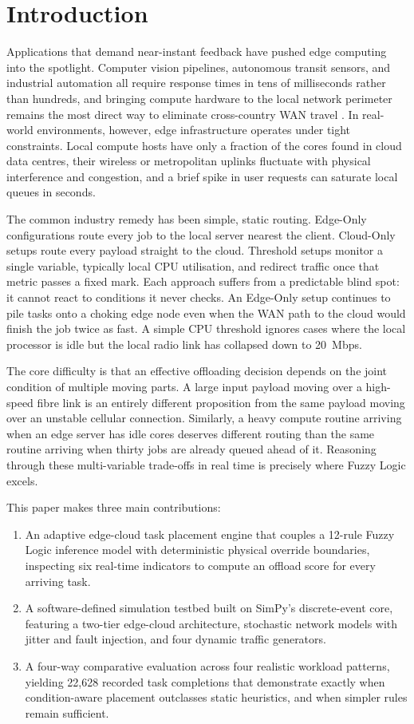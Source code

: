 \documentclass[conference]{IEEEtran}
\begin{document}
\section{Introduction}

Applications that demand near-instant feedback have pushed edge computing into the spotlight. Computer vision pipelines, autonomous transit sensors, and industrial automation all require response times in tens of milliseconds rather than hundreds, and bringing compute hardware to the local network perimeter remains the most direct way to eliminate cross-country WAN travel \cite{mao2017survey}. In real-world environments, however, edge infrastructure operates under tight constraints. Local compute hosts have only a fraction of the cores found in cloud data centres, their wireless or metropolitan uplinks fluctuate with physical interference and congestion, and a brief spike in user requests can saturate local queues in seconds.

The common industry remedy has been simple, static routing. Edge-Only configurations route every job to the local server nearest the client. Cloud-Only setups route every payload straight to the cloud. Threshold setups monitor a single variable, typically local CPU utilisation, and redirect traffic once that metric passes a fixed mark. Each approach suffers from a predictable blind spot: it cannot react to conditions it never checks. An Edge-Only setup continues to pile tasks onto a choking edge node even when the WAN path to the cloud would finish the job twice as fast. A simple CPU threshold ignores cases where the local processor is idle but the local radio link has collapsed down to 20~Mbps.

The core difficulty is that an effective offloading decision depends on the joint condition of multiple moving parts. A large input payload moving over a high-speed fibre link is an entirely different proposition from the same payload moving over an unstable cellular connection. Similarly, a heavy compute routine arriving when an edge server has idle cores deserves different routing than the same routine arriving when thirty jobs are already queued ahead of it. Reasoning through these multi-variable trade-offs in real time is precisely where Fuzzy Logic excels.

This paper makes three main contributions:
\begin{enumerate}
  \item An adaptive edge-cloud task placement engine that couples a 12-rule Fuzzy Logic inference model with deterministic physical override boundaries, inspecting six real-time indicators to compute an offload score for every arriving task.
  \item A software-defined simulation testbed built on SimPy's discrete-event core, featuring a two-tier edge-cloud architecture, stochastic network models with jitter and fault injection, and four dynamic traffic generators.
  \item A four-way comparative evaluation across four realistic workload patterns, yielding 22{,}628 recorded task completions that demonstrate exactly when condition-aware placement outclasses static heuristics, and when simpler rules remain sufficient.
\end{enumerate}
\end{document}

